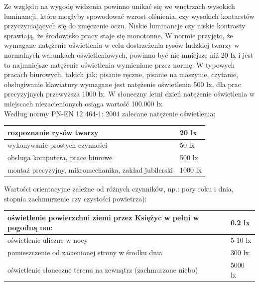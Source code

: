 \documentclass[a4paper,12pt]{article}
\begin{document}
Ze względu na wygodę widzenia powinno unikać się we wnętrzach wysokich luminancji, które mogłyby spowodować wzrost olśnienia, czy wysokich kontarstów przyczyniających się do zmęczenie oczu. Niskie luminancje czy niskie kontrasty sprawiają, że środowisko pracy staje się monotonne.
\newpage
W normie przyjęto, że wymagane natężenie oświetlenia w celu dostrzeżenia rysów ludzkiej twarzy w normalnych warunkach oświetleniowych, powinno być nie mniejsze niż 20 lx i jest to najmniejsze natężenie oświetlenia wymieniane przez normę. W typowych pracach biurowych, takich jak: pisanie ręczne, pisanie na maszynie, czytanie, obsługiwanie klawiatury wymagane jest natężenie oświetlenia 500 lx, dla prac precyzyjnych przewyższa 1000 lx. W słoneczny letni dzień natężenie oświetlenia w miejscach niezacienionych osiąga wartość 100.000 lx.\\

\noindent Według normy PN-EN 12 464-1: 2004 zalecane natężenie oświetlenia:
	\begin{center}
		\begin{table}[!h]
        		\centering     
			\begin{tabular}{|p{}|p{}|}
				\hline 
				rozpoznanie rysów twarzy & 20 lx \\
				\hline 
				wykonywanie prostych czynności  & 50 lx \\
				\hline 
				obsługa komputera, prace biurowe & 500 lx \\
				\hline 
				montaż precyzyjny, mikromechanika, zakład jubilerski   & 1000 lx \\
 				\hline
			\end{tabular}     
       		 \end{table}
	\end{center}
Wartości orientacyjne zależne od różnych czynników, np.: pory roku i dnia, stopnia zachmurzenie czy czystości powietrza):
	\begin{center}
		\begin{table}[!h]
        		\centering     
			\begin{tabular}{|p{}|p{}|}
				\hline 
				 oświetlenie powierzchni ziemi przez Księżyc w pełni w pogodną noc & 0.2 lx \\
				\hline 
				oświetlenie uliczne w nocy  & 5-10 lx \\
				\hline 
				pomieszczenie od zacienionej strony w środku dnia & 300 lx \\
				\hline 
				oświetlenie słoneczne terenu na zewnątrz (zachmurzone niebo)   & 5000 lx \\
 				\hline
			\end{tabular}     
       		 \end{table}
	\end{center}
\end{document}
